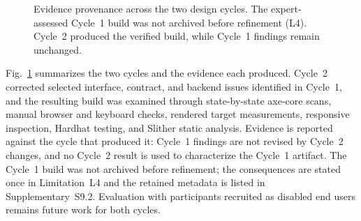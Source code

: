 \documentclass[journal]{IEEEtran}
\begin{document}
\begin{figure}[!t]
\centering
{}
\caption{Evidence provenance across the two design cycles. The expert-assessed Cycle~1 build was not archived before refinement (L4). Cycle~2 produced the verified build, while Cycle~1 findings remain unchanged.}
\label{fig:cycles}
\end{figure}

Fig.~\ref{fig:cycles} summarizes the two cycles and the evidence each produced. Cycle~2 corrected selected interface, contract, and backend issues identified in Cycle~1, and the resulting build was examined through state-by-state axe-core scans, manual browser and keyboard checks, rendered target measurements, responsive inspection, Hardhat testing, and Slither static analysis. Evidence is reported against the cycle that produced it: Cycle~1 findings are not revised by Cycle~2 changes, and no Cycle~2 result is used to characterize the Cycle~1 artifact. The Cycle~1 build was not archived before refinement; the consequences are stated once in Limitation~L4 and the retained metadata is listed in Supplementary~S9.2. Evaluation with participants recruited as disabled end users remains future work for both cycles.
\end{document}
